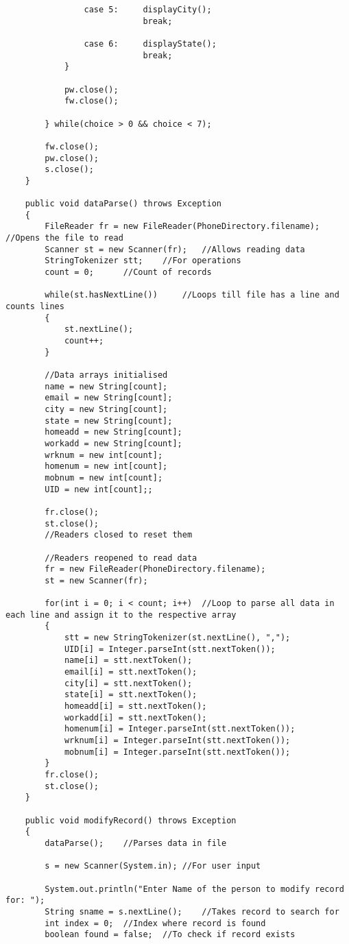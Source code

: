 \documentclass[ProgramminAssignment.tex]{subfiles}
\begin{document}
\begin{lstlisting}
				case 5:		displayCity();
							break;
					
				case 6:		displayState();
							break;
			}
			
			pw.close();
			fw.close();
			
		} while(choice > 0 && choice < 7);
		
		fw.close();
		pw.close();
		s.close();
	}

	public void dataParse() throws Exception
	{
		FileReader fr = new FileReader(PhoneDirectory.filename);		//Opens the file to read
		Scanner st = new Scanner(fr);	//Allows reading data
		StringTokenizer stt;	//For operations
		count = 0;		//Count of records
		
		while(st.hasNextLine())		//Loops till file has a line and counts lines
		{
			st.nextLine();
			count++;
		}
		
		//Data arrays initialised
		name = new String[count]; 
		email = new String[count]; 
		city = new String[count]; 
		state = new String[count]; 
		homeadd = new String[count];
		workadd = new String[count];
		wrknum = new int[count]; 
		homenum = new int[count];
		mobnum = new int[count];
		UID = new int[count];;
			
		fr.close();
		st.close();
		//Readers closed to reset them
		
		//Readers reopened to read data
		fr = new FileReader(PhoneDirectory.filename);
		st = new Scanner(fr);
		
		for(int i = 0; i < count; i++)	//Loop to parse all data in each line and assign it to the respective array
		{
			stt = new StringTokenizer(st.nextLine(), ",");
			UID[i] = Integer.parseInt(stt.nextToken());
			name[i] = stt.nextToken();
			email[i] = stt.nextToken();
			city[i] = stt.nextToken();
			state[i] = stt.nextToken();
			homeadd[i] = stt.nextToken();
			workadd[i] = stt.nextToken();
			homenum[i] = Integer.parseInt(stt.nextToken());
			wrknum[i] = Integer.parseInt(stt.nextToken());
			mobnum[i] = Integer.parseInt(stt.nextToken());
		}
		fr.close();
		st.close();
	}
	
	public void modifyRecord() throws Exception
	{
		dataParse();	//Parses data in file
		
		s = new Scanner(System.in);	//For user input
		
		System.out.println("Enter Name of the person to modify record for: ");
		String sname = s.nextLine();	//Takes record to search for
		int index = 0;	//Index where record is found
		boolean found = false;	//To check if record exists
		

\end{lstlisting}
\end{document}
